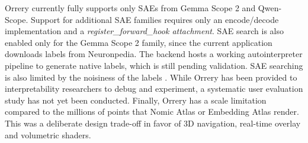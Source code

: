 \documentclass[11pt]{article}
\begin{document}
Orrery currently fully supports only SAEs from Gemma Scope 2 and Qwen-Scope. Support for additional SAE families requires only an encode/decode implementation and a \textit{register\_forward\_hook attachment}. SAE search is also enabled only for the Gemma Scope 2 family, since the current application downloads labels from Neuronpedia. The backend hosts a working autointerpreter pipeline to generate native labels, which is still pending validation. SAE searching is also limited by the noisiness of the labels \cite{jiang2025interpretableembeddingssparseautoencoders}. While Orrery has been provided to interpretability researchers to debug and experiment, a systematic user evaluation study has not yet been conducted. Finally, Orrery has a scale limitation compared to the millions of points that Nomic Atlas or Embedding Atlas render. This was a deliberate design trade-off in favor of 3D navigation, real-time overlay and volumetric shaders. 









\end{document}
